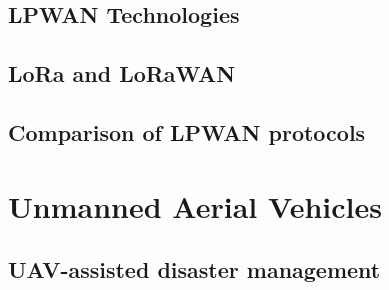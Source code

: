\subsection{LPWAN Technologies}

\subsection{LoRa and LoRaWAN}

\subsection{Comparison of LPWAN protocols}

\section{Unmanned Aerial Vehicles}

\subsection{UAV-assisted disaster management}